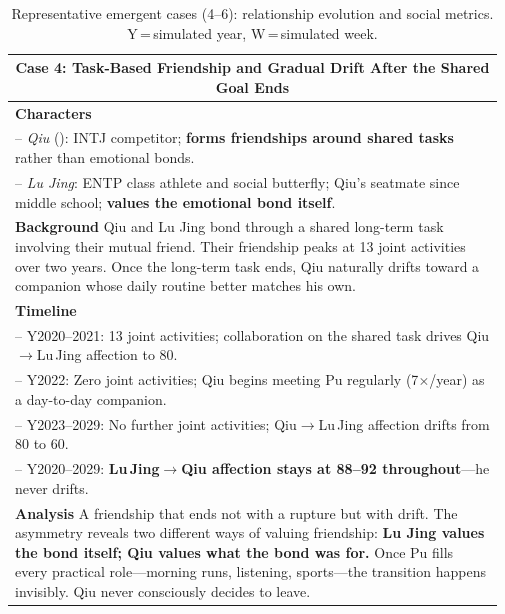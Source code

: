 \begin{table}[htbp]
\centering\small
\caption{Representative emergent cases (4--6): relationship evolution and social metrics. Y\,=\,simulated year, W\,=\,simulated week.}
\label{tab:cases_4_6}
\begin{tabular}{p{0.97\linewidth}}
\toprule

\multicolumn{1}{c}{\textbf{Case 4: Task-Based Friendship and Gradual Drift After the Shared Goal Ends}}\\
\midrule
\textbf{Characters}\\
\quad -- \textit{Qiu} (\campus{}): INTJ competitor;
  \textbf{forms friendships around shared tasks} rather than emotional bonds.\\
\quad -- \textit{Lu Jing}: ENTP class athlete and social butterfly;
  Qiu's seatmate since middle school;
  \textbf{values the emotional bond itself}.\\[2pt]
\textbf{Background}\quad
Qiu and Lu Jing bond through a shared long-term task involving their mutual friend.
Their friendship peaks at 13 joint activities over two years.
Once the long-term task ends, Qiu naturally drifts toward a companion
whose daily routine better matches his own.\\[2pt]
\textbf{Timeline}\\
\quad -- Y2020--2021: 13 joint activities;
  collaboration on the shared task drives Qiu$\to$Lu\,Jing affection to 80.\\
\quad -- Y2022: Zero joint activities;
  Qiu begins meeting Pu regularly (7$\times$/year) as a day-to-day companion.\\
\quad -- Y2023--2029: No further joint activities;
  Qiu$\to$Lu\,Jing affection drifts from 80 to 60.\\
\quad -- Y2020--2029: \textbf{Lu\,Jing$\to$Qiu affection stays at 88--92 throughout}---he never drifts.\\[2pt]
\textbf{Analysis}\quad
A friendship that ends not with a rupture but with drift.
The asymmetry reveals two different ways of valuing friendship:
\textbf{Lu Jing values the bond itself; Qiu values what the bond was for.}
Once Pu fills every practical role---morning runs, listening, sports---the
transition happens invisibly.
Qiu never consciously decides to leave.\\

\midrule


\end{tabular}
\end{table}
